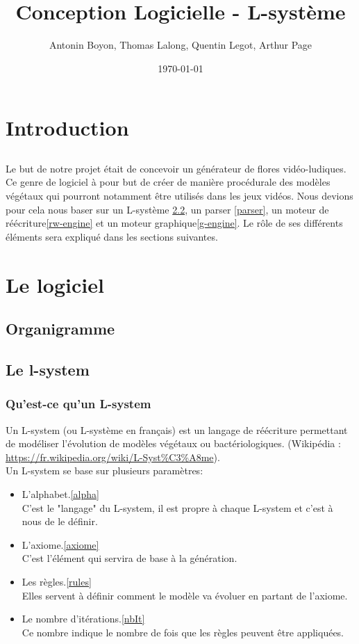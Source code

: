 \documentclass[12pt]{article}
\title{Conception Logicielle - L-système}
\author{Antonin Boyon,  Thomas Lalong,  Quentin Legot,  Arthur Page}
\date{\today}
\begin{document}
\maketitle
\thispagestyle{empty}
\setcounter{page}{0}
\newpage

\tableofcontents
\newpage

\section{Introduction}
\subsection{}
Le but de notre projet était de concevoir un générateur de flores vidéo-ludiques. Ce genre de logiciel à pour but de créer de manière procédurale des modèles végétaux qui pourront notamment être utilisés dans les jeux vidéos. Nous devions pour cela nous baser sur un L-système \ref{l-system}, un parser \ref{parser}, un moteur de réécriture\ref{rw-engine} et un moteur graphique\ref{g-engine}. Le rôle de ses différents éléments sera expliqué dans les sections suivantes. 


\section{Le logiciel}
\subsection{Organigramme}

\subsection{Le l-system}
\label{l-system}
\subsubsection{Qu'est-ce qu'un L-system}
Un L-system (ou L-système en français) est un langage de réécriture permettant de modéliser l'évolution de modèles végétaux ou bactériologiques. (Wikipédia : \url{https://fr.wikipedia.org/wiki/L-Syst%C3%A8me}).
\\
Un L-system se base sur plusieurs paramètres:
\begin{itemize}
\item L'alphabet.\ref{alpha}\\
C'est le "langage" du L-system, il est propre à chaque L-system et c'est à nous de le définir.
\item L'axiome.\ref{axiome}\\
C'est l'élément qui servira de base à la génération. 
\item Les règles.\ref{rules}\\
Elles servent à définir comment le modèle va évoluer en partant de l'axiome.
\item Le nombre d'itérations.\ref{nbIt}\\
Ce nombre indique le nombre de fois que les règles peuvent être appliquées.
\end{itemize}
\end{document}
